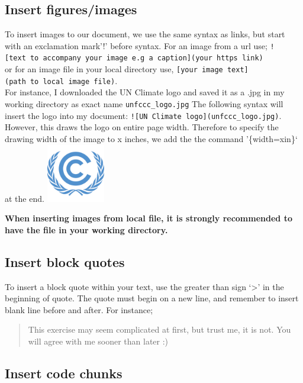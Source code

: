 \documentclass[
]{book}
\begin{document}
\hypertarget{insert-figuresimages}{%
\subsection{Insert figures/images}\label{insert-figuresimages}}

To insert images to our document, we use the same syntax as links, but start with an exclamation mark'!' before syntax.
For an image from a url use; \texttt{!{[}text\ to\ accompany\ your\ image\ e.g\ a\ caption{]}(your\ https\ link)}\\
or for an image file in your local directory use, \texttt{{[}your\ image\ text{]}(path\ to\ local\ image\ file)}.\\
For instance, I downloaded the UN Climate logo and saved it as a .jpg in my working directory as exact name \texttt{unfccc\_logo.jpg}
The following syntax will insert the logo into my document:
\texttt{!{[}UN\ Climate\ logo{]}(unfccc\_logo.jpg)}. However, this draws the logo on entire page width. Therefore to specify the drawing width of the image to x inches, we add the the command '\{width=xin\}` at the end. \includegraphics[width=1in,height=\textheight]{unfccc_logo.jpg}

\textbf{When inserting images from local file, it is strongly recommended to have the file in your working directory.}

\hypertarget{insert-block-quotes}{%
\subsection{Insert block quotes}\label{insert-block-quotes}}

To insert a block quote within your text, use the greater than sign `\textgreater{}' in the beginning of quote. The quote must begin on a new line, and remember to insert blank line before and after. For instance;

\begin{quote}
This exercise may seem complicated at first,
but trust me, it is not. You will agree with me sooner than later :)
\end{quote}

\hypertarget{insert-code-chunks}{%
\subsection{Insert code chunks}\label{insert-code-chunks}}
\end{document}
